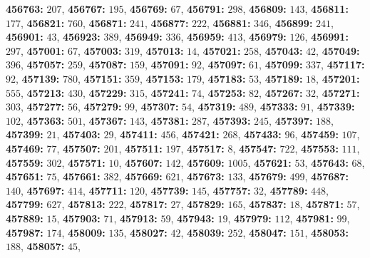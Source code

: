 \textsf{\bfseries 456763:} $207$, \textsf{\bfseries 456767:} $195$, \textsf{\bfseries 456769:} $67$, \textsf{\bfseries 456791:} $298$, \textsf{\bfseries 456809:} $143$, \textsf{\bfseries 456811:} $177$, \textsf{\bfseries 456821:} $760$, \textsf{\bfseries 456871:} $241$, \textsf{\bfseries 456877:} $222$, \textsf{\bfseries 456881:} $346$, \textsf{\bfseries 456899:} $241$, \textsf{\bfseries 456901:} $43$, \textsf{\bfseries 456923:} $389$, \textsf{\bfseries 456949:} $336$, \textsf{\bfseries 456959:} $413$, \textsf{\bfseries 456979:} $126$, \textsf{\bfseries 456991:} $297$, \textsf{\bfseries 457001:} $67$, \textsf{\bfseries 457003:} $319$, \textsf{\bfseries 457013:} $14$, \textsf{\bfseries 457021:} $258$, \textsf{\bfseries 457043:} $42$, \textsf{\bfseries 457049:} $396$, \textsf{\bfseries 457057:} $259$, \textsf{\bfseries 457087:} $159$, \textsf{\bfseries 457091:} $92$, \textsf{\bfseries 457097:} $61$, \textsf{\bfseries 457099:} $337$, \textsf{\bfseries 457117:} $92$, \textsf{\bfseries 457139:} $780$, \textsf{\bfseries 457151:} $359$, \textsf{\bfseries 457153:} $179$, \textsf{\bfseries 457183:} $53$, \textsf{\bfseries 457189:} $18$, \textsf{\bfseries 457201:} $555$, \textsf{\bfseries 457213:} $430$, \textsf{\bfseries 457229:} $315$, \textsf{\bfseries 457241:} $74$, \textsf{\bfseries 457253:} $82$, \textsf{\bfseries 457267:} $32$, \textsf{\bfseries 457271:} $303$, \textsf{\bfseries 457277:} $56$, \textsf{\bfseries 457279:} $99$, \textsf{\bfseries 457307:} $54$, \textsf{\bfseries 457319:} $489$, \textsf{\bfseries 457333:} $91$, \textsf{\bfseries 457339:} $102$, \textsf{\bfseries 457363:} $501$, \textsf{\bfseries 457367:} $143$, \textsf{\bfseries 457381:} $287$, \textsf{\bfseries 457393:} $245$, \textsf{\bfseries 457397:} $188$, \textsf{\bfseries 457399:} $21$, \textsf{\bfseries 457403:} $29$, \textsf{\bfseries 457411:} $456$, \textsf{\bfseries 457421:} $268$, \textsf{\bfseries 457433:} $96$, \textsf{\bfseries 457459:} $107$, \textsf{\bfseries 457469:} $77$, \textsf{\bfseries 457507:} $201$, \textsf{\bfseries 457511:} $197$, \textsf{\bfseries 457517:} $8$, \textsf{\bfseries 457547:} $722$, \textsf{\bfseries 457553:} $111$, \textsf{\bfseries 457559:} $302$, \textsf{\bfseries 457571:} $10$, \textsf{\bfseries 457607:} $142$, \textsf{\bfseries 457609:} $1005$, \textsf{\bfseries 457621:} $53$, \textsf{\bfseries 457643:} $68$, \textsf{\bfseries 457651:} $75$, \textsf{\bfseries 457661:} $382$, \textsf{\bfseries 457669:} $621$, \textsf{\bfseries 457673:} $133$, \textsf{\bfseries 457679:} $499$, \textsf{\bfseries 457687:} $140$, \textsf{\bfseries 457697:} $414$, \textsf{\bfseries 457711:} $120$, \textsf{\bfseries 457739:} $145$, \textsf{\bfseries 457757:} $32$, \textsf{\bfseries 457789:} $448$, \textsf{\bfseries 457799:} $627$, \textsf{\bfseries 457813:} $222$, \textsf{\bfseries 457817:} $27$, \textsf{\bfseries 457829:} $165$, \textsf{\bfseries 457837:} $18$, \textsf{\bfseries 457871:} $57$, \textsf{\bfseries 457889:} $15$, \textsf{\bfseries 457903:} $71$, \textsf{\bfseries 457913:} $59$, \textsf{\bfseries 457943:} $19$, \textsf{\bfseries 457979:} $112$, \textsf{\bfseries 457981:} $99$, \textsf{\bfseries 457987:} $174$, \textsf{\bfseries 458009:} $135$, \textsf{\bfseries 458027:} $42$, \textsf{\bfseries 458039:} $252$, \textsf{\bfseries 458047:} $151$, \textsf{\bfseries 458053:} $188$, \textsf{\bfseries 458057:} $45$, 
